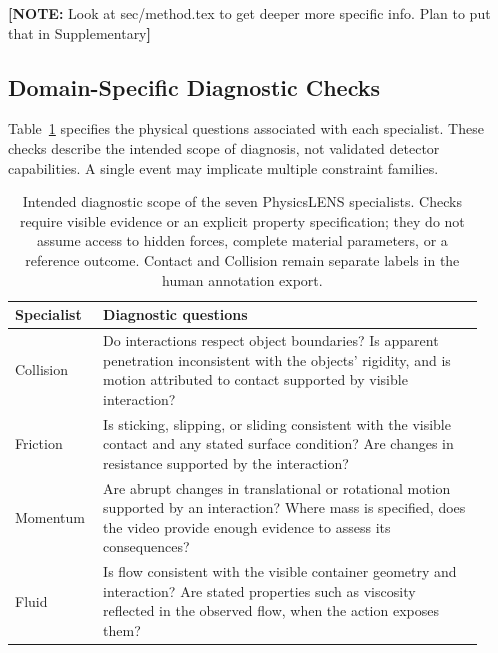 \documentclass{article} %
\newcommand{\authornote}[1]{\textcolor{AuthorNote}{\textbf{[NOTE:} #1\textbf{]}}}
\begin{document}
\authornote{Look at sec/method.tex to get deeper more specific info. Plan to put that in Supplementary}

\subsection{Domain-Specific Diagnostic Checks}
\label{sec:specialist-checks}

Table~\ref{tab:specialists} specifies the physical questions
associated with each specialist. These checks describe
the intended scope of diagnosis, not validated detector
capabilities. A single event may implicate multiple
constraint families.

\begin{table}[t]
    \centering
    \small
    \caption{Intended diagnostic scope of the seven
    PhysicsLENS specialists. Checks require visible evidence
    or an explicit property specification; they do not assume
    access to hidden forces, complete material parameters,
    or a reference outcome. Contact and Collision remain
    separate labels in the human annotation export.}
    \label{tab:specialists}
    \begin{tabular}{@{}p{0.16\linewidth}p{0.77\linewidth}@{}}
        \toprule
        Specialist & Diagnostic questions \\
        \midrule
        Collision &
        Do interactions respect object boundaries?
        Is apparent penetration inconsistent with the
        objects' rigidity, and is motion attributed to
        contact supported by visible interaction? \\

        Friction &
        Is sticking, slipping, or sliding consistent with
        the visible contact and any stated surface
        condition? Are changes in resistance supported
        by the interaction? \\

        Momentum &
        Are abrupt changes in translational or rotational
        motion supported by an interaction? Where mass
        is specified, does the video provide enough
        evidence to assess its consequences? \\

        Fluid &
        Is flow consistent with the visible container
        geometry and interaction? Are stated properties
        such as viscosity reflected in the observed
        flow, when the action exposes them? \\


\end{tabular}
\end{table}
\end{document}
